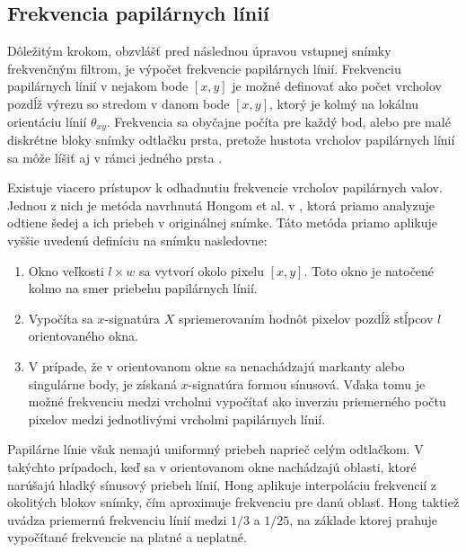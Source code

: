   \subsection{Frekvencia papilárnych línií}
  Dôležitým krokom, obzvlášť pred následnou úpravou vstupnej snímky frekvenčným filtrom, je výpočet frekvencie papilárnych línií.
  Frekvenciu papilárnych línií v nejakom bode $[x,y]$ je možné definovať ako počet vrcholov pozdĺž výrezu so stredom v danom bode $[x,y]$,
  ktorý je kolmý na lokálnu orientáciu línií $\theta_{xy}$. Frekvencia sa obyčajne počíta pre každý bod, alebo pre malé diskrétne bloky snímky odtlačku prsta,
  pretože hustota vrcholov papilárnych línií sa môže líšiť aj v rámci jedného prsta \cite{Handbook}.

  Existuje viacero prístupov k odhadnutiu frekvencie vrcholov papilárnych valov. Jednou z nich je metóda navrhnutá Hongom et al. v \cite{Hong},
  ktorá priamo analyzuje odtiene šedej a ich priebeh v originálnej snímke. Táto metóda priamo aplikuje vyššie uvedenú definíciu na snímku nasledovne:

  \begin{enumerate}
    \item Okno veľkosti $l \times{} w$ sa vytvorí okolo pixelu $[x,y]$. Toto okno je natočené kolmo na smer priebehu papilárnych línií.
    \item Vypočíta sa $x$-signatúra $X$ spriemerovaním hodnôt pixelov pozdĺž stĺpcov $l$ orientovaného okna.
    \item V prípade, že v orientovanom okne sa nenachádzajú markanty alebo singulárne body, je získaná $x$-signatúra formou sínusová. Vďaka tomu je
          možné frekvenciu medzi vrcholmi vypočítať ako inverziu priemerného počtu pixelov medzi jednotlivými vrcholmi papilárnych línií.
  \end{enumerate}
  Papilárne línie však nemajú uniformný priebeh naprieč celým odtlačkom. V takýchto prípadoch, keď sa v orientovanom okne nachádzajú oblasti, ktoré narúšajú
  hladký sínusový priebeh línií, Hong aplikuje interpoláciu frekvencií z okolitých blokov snímky, čím aproximuje frekvenciu pre danú oblasť. Hong taktiež uvádza
  priemernú frekvenciu línií medzi $1/3$ a $1/25$, na základe ktorej prahuje vypočítané frekvencie na platné a neplatné.

